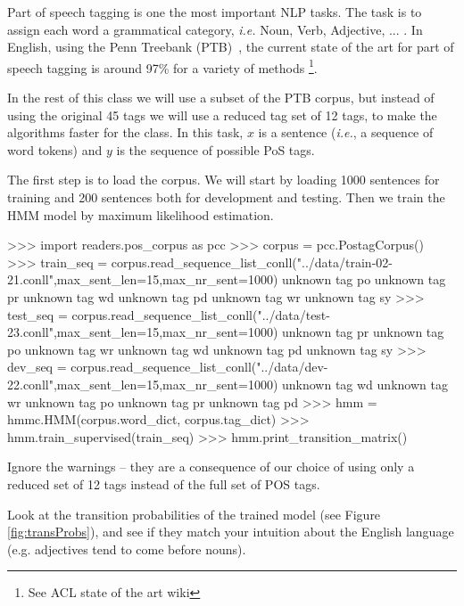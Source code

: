 Part of speech tagging is one the most important NLP tasks. The
task is to assign each word a grammatical category, \emph{i.e.} Noun,
Verb, Adjective, ... . In English, using the Penn Treebank (PTB)~\citep{pennTreeBank}, the current
state of the art for part of speech tagging is around 97\% for a
variety of methods \footnote{See ACL state of the art wiki}.

In the rest of this class we will use a subset of the PTB corpus, but
instead of using the original 45 tags we will use a reduced tag set of
12 tags, to make the algorithms faster for the
class. In this task, $x$ is a sentence (\emph{i.e.}, a sequence of word tokens) and $y$
is the sequence of possible PoS tags.

The first step is to load the corpus. We will start by loading
1000 sentences for training and 200 sentences both for development and
testing. Then we train the HMM model by maximum 
likelihood estimation.
\begin{python}
>>> import readers.pos_corpus as pcc
>>> corpus = pcc.PostagCorpus()
>>> train_seq = corpus.read_sequence_list_conll("../data/train-02-21.conll",max_sent_len=15,max_nr_sent=1000)
unknown tag po
unknown tag pr
unknown tag wd
unknown tag pd
unknown tag wr
unknown tag sy
>>> test_seq = corpus.read_sequence_list_conll("../data/test-23.conll",max_sent_len=15,max_nr_sent=1000)
unknown tag pr
unknown tag po
unknown tag wr
unknown tag wd
unknown tag pd
unknown tag sy
>>> dev_seq = corpus.read_sequence_list_conll("../data/dev-22.conll",max_sent_len=15,max_nr_sent=1000)
unknown tag wd
unknown tag wr
unknown tag po
unknown tag pr
unknown tag pd
>>> hmm = hmmc.HMM(corpus.word_dict, corpus.tag_dict)
>>> hmm.train_supervised(train_seq)
>>> hmm.print_transition_matrix()
\end{python}

Ignore the warnings -- they are a consequence of our choice of using only a reduced set of 12 tags instead of the full set of POS tags.


Look at the transition probabilities of the trained model
 (see
Figure \ref{fig:transProbs}), and see if they match your intuition
about the English language (e.g. adjectives tend to come before nouns).

